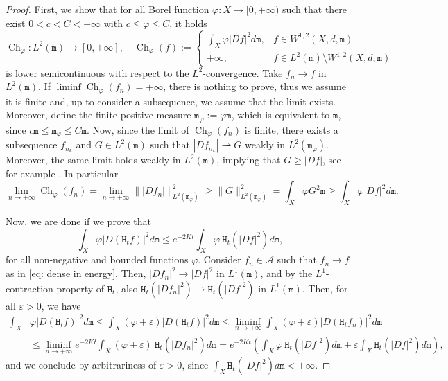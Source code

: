 \documentclass[10pt,leqno]{amsart}
\numberwithin{equation}{section}
\newcommand{\ttm}{\mathtt{m}}
\newcommand{\ttH}{\mathtt{H}}
\begin{document}
\begin{proof}
    First, we show that for all Borel function $\varphi:X \to [0,+\infty)$ such that there exist $0< c < C <+\infty$ with $c\leq \varphi \leq C$, it holds 
    \begin{equation}
    \operatorname{Ch}_\varphi: L^2(\ttm) \to [0,+\infty], \quad 
    \operatorname{Ch}_\varphi(f):=
    \begin{cases} 
    \int_{X} \varphi |Df|^2 d\ttm, & f\in W^{1,2}(X,d,\ttm)
    \\
    +\infty, & f\in L^2(\ttm)\setminus W^{1,2}(X,d,\ttm)
    \end{cases}
    \end{equation}
    is lower semicontinuous with respect to the $L^2$-convergence. Take $f_n \to f$ in $L^2(\ttm)$. If $\liminf \operatorname{Ch}_\varphi(f_n) = +\infty$, there is nothing to prove, thus we assume it is finite and, up to consider a subsequence, we assume that the limit exists. Moreover, define the finite positive measure $\ttm_\varphi := \varphi \ttm$, which is equivalent to $\ttm$, since $c \ttm \leq  \ttm_\varphi \leq C \ttm$. Now, since the limit of $\operatorname{Ch}_\varphi(f_n)$ is finite, there exists a subsequence $f_{n_k}$ and $G \in L^2(\ttm)$ such that $|D f_{n_k}| \rightharpoonup G$ weakly in $L^2(\ttm_\varphi)$. Moreover, the same limit holds weakly in $L^2(\ttm)$, implying that $G \geq |Df|$, see for example \cite[Proposition 2.1.13]{gigli2020lectures}. In particular
    \[\lim_{n\to +\infty} \operatorname{Ch}_\varphi(f_n) = \lim_{n\to+\infty} \||Df_n|\|_{L^2(\ttm_\varphi)}^2 \geq \|G\|_{L^2(\ttm_\varphi)}^2 = \int_{X} \varphi G^2 \ttm \geq \int_X \varphi |Df|^2 d\ttm.\]
    
    Now, we are done if we prove that 
    \[\int_X \varphi |D(\mathtt{H}_t f)|^2 d\ttm  \leq e^{-2Kt} \int_X \varphi \ \mathtt{H}_t(|Df|^2) d\ttm, \]
    for all non-negative and bounded functions $\varphi$. Consider $f_n \in \mathcal{A}$ such that $f_n \to f$ as in \eqref{eq: dense in energy}. Then, $|Df_n|^2 \to |Df|^2 $ in $L^1(\ttm)$, and by the $L^1$-contraction property of $\ttH_t$, also $\ttH_t(|Df_n|^2) \to \ttH_t(|Df|^2) $ in $L^1(\ttm)$. Then, for all $\varepsilon>0$, we have 
    \[
    \begin{aligned}
    \int_X & \varphi |D(\mathtt{H}_t f)|^2 d\ttm \leq  \int_X  (\varphi+\varepsilon) |D(\mathtt{H}_t f)|^2 d\ttm \leq   \liminf_{n\to+\infty} \int_X (\varphi+\varepsilon) |D(\mathtt{H}_t f_n)|^2 d\ttm 
    \\
    & \leq \liminf_{n\to +\infty} e^{-2Kt} \int_X (\varphi +\varepsilon)\ \mathtt{H}_t(|Df_n|^2) d\ttm = e^{-2Kt}\left( \int_X \varphi \ \mathtt{H}_t(|Df|^2) d\ttm + \varepsilon \int_X \ttH_t(|Df|^2)d\ttm \right),  
    \end{aligned}
    \]
    and we conclude by arbitrariness of $\varepsilon>0$, since $\int_X \ttH_t(|Df|^2)d\ttm<+\infty$.
\end{proof}
\end{document}
